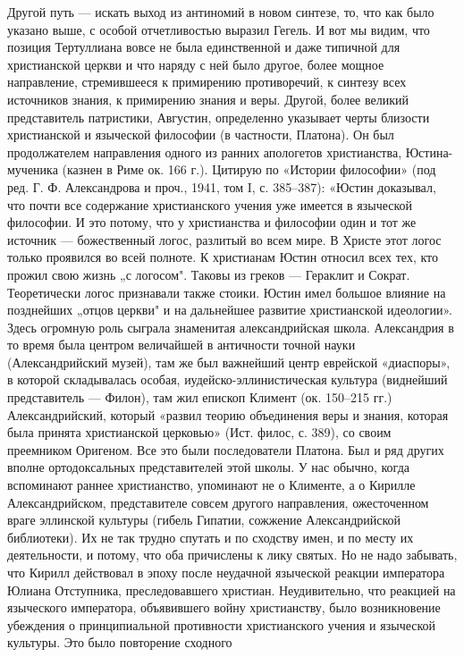 Другой путь --- искать выход из антиномий в новом синтезе, то, что как было
указано выше, с особой отчетливостью выразил Гегель. И вот мы видим, что
позиция Тертуллиана вовсе не была единственной и даже типичной для христианской
церкви и что наряду с ней было другое, более мощное направление, стремившееся к
примирению противоречий, к синтезу всех источников знания, к примирению знания
и веры. Другой, более великий представитель патристики, Августин, определенно
указывает черты близости христианской и языческой философии (в частности,
Платона). Он был продолжателем направления одного из ранних апологетов
христианства, Юстина-мученика (казнен в Риме ок. 166 г.). Цитирую по «Истории
философии» (под ред. Г. Ф. Александрова и проч., 1941, том I, с. 385--387):
«Юстин доказывал, что почти все содержание христианского учения уже имеется в
языческой философии. И это потому, что у христианства и философии один и тот же
источник --- божественный логос, разлитый во всем мире. В Христе этот логос
только проявился во всей полноте. К христианам Юстин относил всех тех, кто
прожил свою жизнь „с логосом". Таковы из греков --- Гераклит и Сократ.
Теоретически логос признавали также стоики. Юстин имел большое влияние на
позднейших „отцов церкви" и на дальнейшее развитие христианской идеологии».
Здесь огромную роль сыграла знаменитая александрийская школа. Александрия в то
время была центром величайшей в античности точной
науки (Александрийский музей), там же был важнейший центр еврейской «диаспоры»,
в которой складывалась особая, иудейско-эллинистическая культура (виднейший
представитель --- Филон), там жил епископ Климент (ок. 150--215 гг.)
Александрийский, который «развил теорию объединения веры и знания, которая была
принята христианской церковью» (Ист. филос, с. 389), со своим преемником
Оригеном. Все это были последователи Платона. Был и ряд других вполне
ортодоксальных представителей этой школы. У нас обычно, когда вспоминают раннее
христианство, упоминают не о Клименте, а о Кирилле Александрийском,
представителе совсем другого направления, ожесточенном враге эллинской культуры
(гибель Гипатии, сожжение Александрийской библиотеки). Их не так трудно спутать
и по сходству имен, и по месту их деятельности, и потому, что оба причислены к
лику святых. Но не надо забывать, что Кирилл действовал в эпоху после неудачной
языческой реакции императора Юлиана Отступника, преследовавшего христиан.
Неудивительно, что реакцией на языческого императора, объявившего войну
христианству, было возникновение убеждения о принципиальной противности
христианского учения и языческой культуры. Это было повторение сходного
